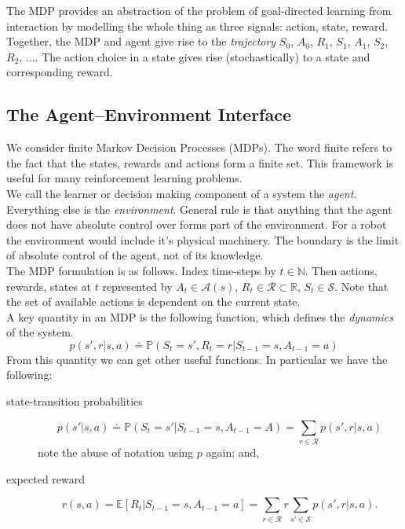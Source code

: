 \documentclass[a4paper, oneside, 11pt]{article}
\renewcommand\P{\mathbb{P}}
\begin{document}
The MDP provides an abstraction of the problem of goal-directed learning from interaction by modelling the whole thing as three signals: action, state, reward.\\

Together, the MDP and agent give rise to the \emph{trajectory} $S_0$, $A_0$, $R_1$, $S_1$, $A_1$, $S_2$, $R_2$, $\dots$. The action choice in a state gives rise (stochastically) to a state and corresponding reward.

\subsection{The Agent–Environment Interface}
We consider finite Markov Decision Processes (MDPs). The word finite refers to the fact that the states, rewards and actions form a finite set. This framework is useful for many reinforcement learning problems.\\

We call the learner or decision making component of a system the \emph{agent}. Everything else is the \emph{environment}. General rule is that anything that the agent does not have absolute control over forms part of the environment. For a robot the environment would include it's physical machinery. The boundary is the limit of absolute control of the agent, not of its knowledge.\\

The MDP formulation is as follows. Index time-steps by $t \in \mathbb{N}$. Then actions, rewards, states at $t$ represented by $A_t \in \mathcal{A}(s)$, $R_t \in \mathcal{R} \subset \mathbb{R}$, $S_t \in \mathcal{S}$. Note that the set of available actions is dependent on the current state.\\

A key quantity in an MDP is the following function, which defines the \emph{dynamics} of the system.
\begin{equation}
    p(s', r | s, a) \doteq \P{} (S_t = s', R_t = r | S_{t-1} = s, A_{t-1} = a)
\end{equation}
From this quantity we can get other useful functions. In particular we have the following: 

\begin{description}
    \item[state-transition probabilities]
\begin{equation}
    p(s' | s, a) \doteq \P{}(S_t = s'| S_{t-1} = s, A_{t-1}=A) = \sum_{r \in \mathcal{R}} p(s', r | s, a)
\end{equation}
note the abuse of notation using $p$ again; and,
    \item[expected reward]
\begin{equation}
    r(s, a) = \mathbb{E}[R_t | S_{t-1} = s, A_{t-1} = a] = \sum_{r \in \mathcal{R}} r \sum_{s' \in \mathcal{S}} p(s', r | s, a).
\end{equation}
\end{description}
\end{document}
